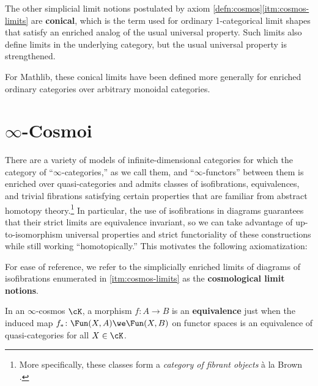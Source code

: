 

The other simplicial limit notions postulated by axiom \ref{defn:cosmos}\ref{itm:cosmos-limits} are \textbf{conical}, which is the term used for ordinary 1-categorical limit shapes that satisfy an enriched analog of the usual universal property.   Such limits also define limits in the underlying category, but the usual universal property is strengthened.


\begin{rmk}
  For Mathlib, these conical limits have been defined more generally for
  enriched ordinary categories over arbitrary monoidal categories.
\end{rmk}

\section{\texorpdfstring{$\infty$}{Infinity}-Cosmoi}\label{sec:cosmos}

There are a variety of models of infinite-dimensional categories for which the category of ``$\infty$-categories,'' as we call them, and ``$\infty$-functors'' between them is enriched over quasi-categories and admits classes of isofibrations, equivalences, and trivial fibrations satisfying certain
properties that are familiar from abstract homotopy theory.\footnote{More specifically, these classes form a \emph{category of fibrant objects} \`{a} la Brown \cite{Brown:1973ah}.} In particular, the use of isofibrations in diagrams guarantees that their strict limits are equivalence invariant, so we can take advantage of up-to-isomorphism universal properties and strict functoriality of these constructions while still working ``homotopically.'' This motivates the following axiomatization:



For ease of reference, we refer to the simplicially enriched limits of diagrams of isofibrations enumerated in \ref{itm:cosmos-limits} as the \textbf{cosmological limit notions}.

\begin{definition}\label{defn:equivalence}
  In an $\infty$-cosmos $\cK$, a morphism $f\colon A \to B$ is an \textbf{equivalence} just when the induced map $f_* \colon\Fun(X,A) \we \Fun(X,B)$ on functor spaces  is an equivalence of quasi-categories for all $X \in \cK$.
\end{definition}

